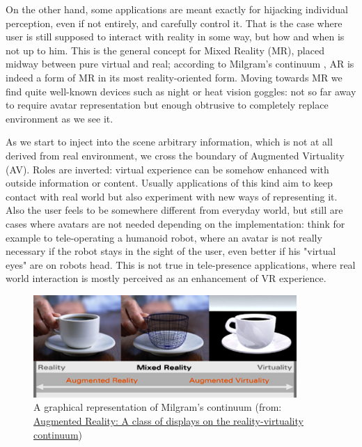 On the other hand, some applications are meant exactly for hijacking individual perception, even if not entirely, and carefully control it. That is the case where user is still supposed to interact with reality in some way, but how and when is not up to him. This is the general concept for Mixed Reality (MR), placed midway between pure virtual and real; according to Milgram’s continuum \cite{milgram_continuum}, AR is indeed a form of MR in its most reality-oriented form. Moving towards MR we find quite well-known devices such as night or heat vision goggles: not so far away to require avatar representation but enough obtrusive to completely replace environment as we see it.

As we start to inject into the scene arbitrary information, which is not at all derived from real environment, we cross the boundary of Augmented Virtuality (AV). Roles are inverted: virtual experience can be somehow enhanced with outside information or content. Usually applications of this kind aim to keep contact with real world but also experiment with new ways of representing it. Also the user feels to be somewhere different from everyday world, but still are cases where avatars are not needed depending on the implementation: think for example to tele-operating a humanoid robot, where an avatar is not really necessary if the robot stays in the sight of the user, even better if his "virtual eyes" are on robots head. This is not true in tele-presence applications, where real world interaction is mostly perceived as an enhancement of VR experience.

\begin{figure}
\centering
\includegraphics[width=10cm]{schemas/milgram_continuum_enhanced}
\caption{A graphical representation of Milgram's continuum (from: \href{http://proceedings.spiedigitallibrary.org/proceeding.aspx?articleid=981543}{Augmented Reality: A class of displays on the reality-virtuality continuum})}
\label{fig:milgram_continuum}
\end{figure}

